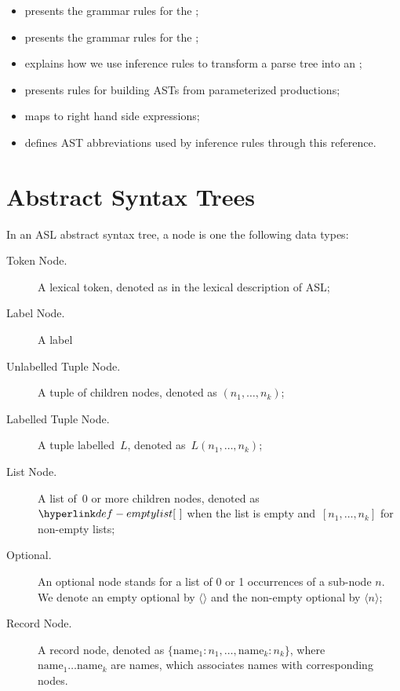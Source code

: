\begin{itemize}
\begin{itemize}
  \end{itemize}
  \item {} presents the grammar rules for the \untypedast;
  \item {} presents the grammar rules for the \typedast;
  \item {} explains how we use inference rules to transform a parse tree into an \untypedast;
  \item {} presents rules for building ASTs from parameterized productions;
  \item {} maps \assignableexpressions{} to right hand side expressions;
  \item {} defines AST abbreviations used by inference rules through this reference.
\end{itemize}

\section{Abstract Syntax Trees\label{sec:AbstractSyntaxTrees}}

In an ASL abstract syntax tree, a node is one the following data types:
\begin{description}
\item[Token Node.] A lexical token, denoted as in the lexical description of ASL;
\item[Label Node.] A label
\item[Unlabelled Tuple Node.] A tuple of children nodes, denoted as $(n_1,\ldots,n_k)$;
\item[Labelled Tuple Node.] A tuple labelled~$L$, denoted as~$L(n_1,\ldots,n_k)$;
\item[List Node.] A list of~$0$ or more children nodes, denoted as~$\emptylist$
      when the list is empty and~$[n_1,\ldots,n_k]$ for non-empty lists;
\item[Optional.] An optional node stands for a list of 0 or 1 occurrences of a sub-node $n$. We denote an empty optional by $\langle\rangle$ and the non-empty optional by $\langle n \rangle$;
\item[Record Node.] A record node, denoted as $\{\text{name}_1 : n_1,\ldots,\text{name}_k : n_k\}$, where \\
      $\text{name}_1 \ldots \text{name}_k$ are names, which associates names with corresponding nodes.
\end{description}

